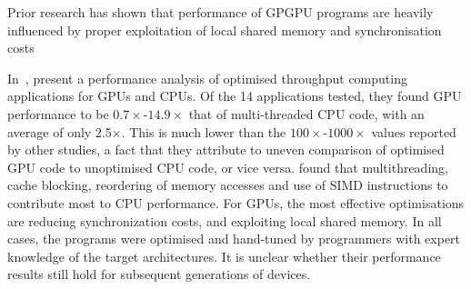 %




Prior research has shown that performance of GPGPU programs are
heavily influenced by proper exploitation of local shared memory and
synchronisation costs~\cite{Ryoo2008a, Lee2010}


In~\cite{Lee2010}, \citeauthor{Lee2010} present a performance analysis
of optimised throughput computing applications for GPUs and CPUs. Of
the 14 applications tested, they found GPU performance to be
$0.7\times$-$14.9\times$ that of multi-threaded CPU code, with an
average of only 2.5$\times$. This is much lower than the
$100\times$-$1000\times$ values reported by other studies,
a fact that they attribute to uneven comparison of optimised GPU code
to unoptimised CPU code, or vice versa. \citeauthor{Lee2010} found
that multithreading, cache blocking, reordering of memory accesses and
use of SIMD instructions to contribute most to CPU performance. For
GPUs, the most effective optimisations are reducing synchronization
costs, and exploiting local shared memory. In all cases, the programs
were optimised and hand-tuned by programmers with expert knowledge of
the target architectures. It is unclear whether their performance
results still hold for subsequent generations of devices.



